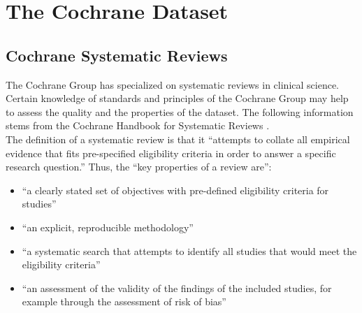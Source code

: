 \documentclass[11pt,a4paper,twoside]{book}\usepackage[]{graphicx}\usepackage[]{color}
\begin{document}












\chapter{The Cochrane Dataset} 


\section{Cochrane Systematic Reviews}
The Cochrane Group has specialized on systematic reviews in clinical science. Certain knowledge of standards and principles of the Cochrane Group may help to assess the quality and the properties of the dataset. The following information stems from the Cochrane Handbook for Systematic Reviews \citep{cochrane.handbook}. \\
The definition of a systematic review is that it ``attempts to collate all empirical evidence that fits pre-specified eligibility criteria in order to answer a specific research question.'' Thus, the ``key properties of a review are'':

\begin{itemize}
\item``a clearly stated set of objectives with pre-defined eligibility criteria for studies''
\item ``an explicit, reproducible methodology''
\item ``a systematic search that attempts to identify all studies that would meet the eligibility criteria''
\item ``an assessment of the validity of the findings of the included studies, for example through the assessment of risk of bias''
\end{itemize}
\end{document}
